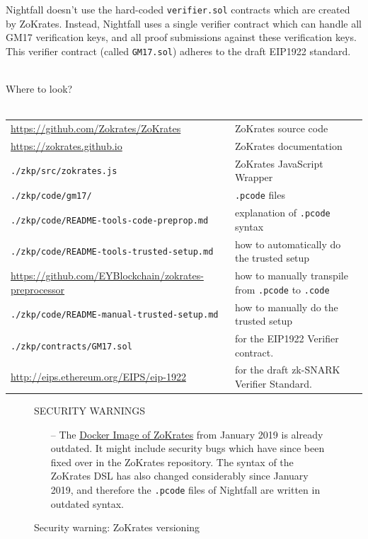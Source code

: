 \documentclass{article}
\begin{document}
\noindent
Nightfall doesn't use the hard-coded \texttt{verifier.sol} contracts which are created by ZoKrates. Instead, Nightfall uses a single verifier contract which can handle all GM17 verification keys, and all proof submissions against these verification keys. This verifier contract (called \texttt{GM17.sol}) adheres to the draft EIP1922 standard.\\
\\

\begin{center}
  \begin{mdframed}[backgroundcolor=verylightblue]
    Where to look?\\
    \\
    \begin{tabular}{lp{14cm}}
      \url{https://github.com/Zokrates/ZoKrates} & ZoKrates source code\\
      \url{https://zokrates.github.io} & ZoKrates documentation\\
      \texttt{./zkp/src/zokrates.js} & ZoKrates JavaScript Wrapper\\
      \texttt{./zkp/code/gm17/} & \texttt{.pcode} files\\
      \texttt{./zkp/code/README-tools-code-preprop.md} & explanation of \texttt{.pcode} syntax\\
      \texttt{./zkp/code/README-tools-trusted-setup.md} & how to automatically do the trusted setup\\
      \url{https://github.com/EYBlockchain/zokrates-preprocessor} & how to manually transpile from \texttt{.pcode} to \texttt{.code}\\
      \texttt{./zkp/code/README-manual-trusted-setup.md} & how to manually do the trusted setup\\
      \texttt{./zkp/contracts/GM17.sol} & for the EIP1922 Verifier contract.\\
      \url{http://eips.ethereum.org/EIPS/eip-1922} & for the draft zk-SNARK Verifier Standard.
    \end{tabular}
  \end{mdframed}
\end{center}

\begin{figure}[H]
  \begin{center}
    \begin{mdframed}[backgroundcolor=verylightred]
      \noindent
      SECURITY WARNINGS
      \begin{itemize}
        \item[--] The \href{https://hub.docker.com/r/michaelconnor/zok}{Docker Image of ZoKrates} from January 2019 is already outdated. It might include security bugs which have since been fixed over in the ZoKrates repository. The syntax of the ZoKrates DSL has also changed considerably since January 2019, and therefore the \texttt{.pcode} files of Nightfall are written in outdated syntax.
      \end{itemize}
    \end{mdframed}
  \end{center}
  \caption{Security warning: ZoKrates versioning}
  \label{fig:zokratesWarning}
\end{figure}
\end{document}
